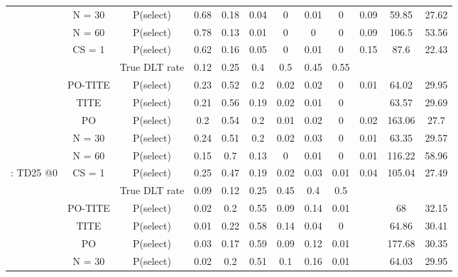 \begin{table}
\begin{singlespace}
{\begin{tabular}[t]{cccccccccccc}
			\rowcolor{gray!6}   & N = 30 & P(select) & 0.68 & 0.18 & 0.04 & 0 & 0.01 & 0 & 0.09 & 59.85 & 27.62\\
			
			\rowcolor{gray!6}   & N = 60 & P(select) & 0.78 & 0.13 & 0.01 & 0 & 0 & 0 & 0.09 & 106.5 & 53.56\\
			
			\rowcolor{gray!6}  \multirow{-7}{*}{\centering\arraybackslash 9: TD25 @-1} & CS = 1 & P(select) & 0.62 & 0.16 & 0.05 & 0 & 0.01 & 0 & 0.15 & 87.6 & 22.43\\
			\cmidrule{1-12}
			&  & True DLT rate & 0.12 & 0.25 & 0.4 & 0.5 & 0.45 & 0.55 &  &  & \\
			
			& PO-TITE & P(select) & 0.23 & 0.52 & 0.2 & 0.02 & 0.02 & 0 & 0.01 & 64.02 & 29.95\\
			
			& TITE & P(select) & 0.21 & 0.56 & 0.19 & 0.02 & 0.01 & 0 &  & 63.57 & 29.69\\
			
			& PO & P(select) & 0.2 & 0.54 & 0.2 & 0.01 & 0.02 & 0 & 0.02 & 163.06 & 27.7\\
			
			& N = 30 & P(select) & 0.24 & 0.51 & 0.2 & 0.02 & 0.03 & 0 & 0.01 & 63.35 & 29.57\\
			
			& N = 60 & P(select) & 0.15 & 0.7 & 0.13 & 0 & 0.01 & 0 & 0.01 & 116.22 & 58.96\\
			
			\multirow{-7}{*}{\centering\arraybackslash 10: TD25 @0} & CS = 1 & P(select) & 0.25 & 0.47 & 0.19 & 0.02 & 0.03 & 0.01 & 0.04 & 105.04 & 27.49\\
			\cmidrule{1-12}
			\rowcolor{gray!6}   &  & True DLT rate & 0.09 & 0.12 & 0.25 & 0.45 & 0.4 & 0.5 &  &  & \\
			
			\rowcolor{gray!6}   & PO-TITE & P(select) & 0.02 & 0.2 & 0.55 & 0.09 & 0.14 & 0.01 &  & 68 & 32.15\\
			
			\rowcolor{gray!6}   & TITE & P(select) & 0.01 & 0.22 & 0.58 & 0.14 & 0.04 & 0 &  & 64.86 & 30.41\\
			
			\rowcolor{gray!6}   & PO & P(select) & 0.03 & 0.17 & 0.59 & 0.09 & 0.12 & 0.01 &  & 177.68 & 30.35\\
			
			\rowcolor{gray!6}   & N = 30 & P(select) & 0.02 & 0.2 & 0.51 & 0.1 & 0.16 & 0.01 &  & 64.03 & 29.95\\
			

\end{tabular}}
\end{singlespace}
\end{table}
